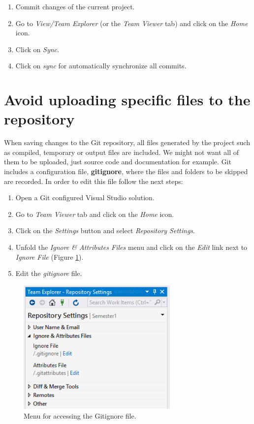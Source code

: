 \begin{enumerate}
	\item Commit changes of the current project.
	\item Go to \textit{View/Team Explorer} (or the \textit{Team Viewer} tab) and click on the \textit{Home} icon.
	\item Click on \textit{Sync}.
	\item Click on \textit{sync} for automatically synchronize all commits.
\end{enumerate}

    \section{Avoid uploading specific files to the repository}

When saving changes to the Git repository, all files generated by the project such as compiled, temporary or output files are included. We might not want all of them to be uploaded, just source code and documentation for example. Git includes a configuration file, \textbf{gitignore}, where the files and folders to be skipped are recorded. In order to edit this file follow the next steps:

\begin{enumerate}
	\item Open a Git configured Visual Studio solution.
	\item Go to \textit{Team Viewer} tab and click on the \textit{Home} icon.
	\item Click on the \textit{Settings} button and select \textit{Repository Settings}.
	\item Unfold the \textit{Ignore \& Attributes Files} menu and click on the \textit{Edit} link next to \textit{Ignore File} (Figure \ref{fig:GitIgnore0}).
	\item Edit the \textit{gitignore} file.
\end{enumerate}

\begin{figure}[h]
	\centering
	\includegraphics[width= 0.7\textwidth]{Figures/GIG0.png}
	\caption{Menu for accessing the Gitignore file.}
	\label{fig:GitIgnore0}
\end{figure}

